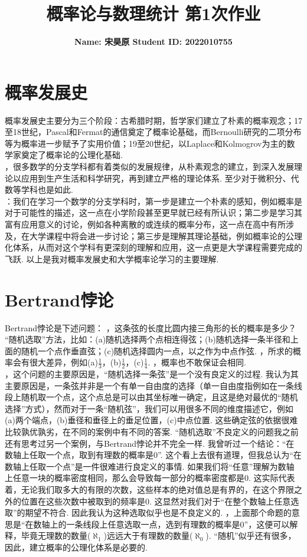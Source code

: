 \documentclass{article}
\title{\bf\Large  概率论与数理统计 第1次作业}
\author{\bf Name: 宋昊原 \qquad Student ID: 2022010755}
\begin{document}
\begin{CJK}{UTF8}{gbsn}
\maketitle

\section{概率发展史}
概率发展史主要分为三个阶段：古希腊时期，哲学家们建立了朴素的概率观念；17至18世纪，Pascal和Fermat的通信奠定了概率论基础，而Bernoulli研究的二项分布等为概率进一步赋予了实用价值；19至20世纪，以Laplace和Kolmogrov为主的数学家奠定了概率论的公理化基础.\\
，很多数学的分支学科都有着类似的发展规律，从朴素观念的建立，到深入发展理论以应用到生产生活和科学研究，再到建立严格的理论体系. 至少对于微积分、代数等学科也是如此. 
\\：我们在学习一个数学的分支学科时，第一步是建立一个朴素的感知，例如概率是对于可能性的描述，这一点在小学阶段甚至更早就已经有所认识；第二步是学习其富有应用意义的讨论，例如各种离散的或连续的概率分布，这一点在高中有所涉及，在大学课程中将会进一步讨论；第三步是理解其理论基础，例如概率论的公理化体系，从而对这个学科有更深刻的理解和应用，这一点更是大学课程需要完成的飞跃. 以上是我对概率发展史和大学概率论学习的主要理解.
\section{Bertrand悖论}
Bertrand悖论是下述问题：
，这条弦的长度比圆内接三角形的长的概率是多少？
“随机选取”方法，比如：(a)随机选择两个点相连得弦；(b)随机选择一条半径和上面的随机一个点作垂直弦；(c)随机选择圆内一点，以之作为中点作弦.
，所求的概率会有很大差异，例如(a)$\frac{1}{3}$，(b)$\frac{1}{2}$，(c)$\frac{1}{4}$.
，概率也不敢保证会相同.
\\
，这个问题的主要原因是，“随机选择一条弦”是一个没有良定义的过程. 我认为其主要原因是，一条弦并非是一个有单一自由度的选择（单一自由度指例如在一条线段上随机取一个点，这个点总是可以由其坐标唯一确定，且这是绝对最优的“随机选择”方式），然而对于一条“随机弦”，我们可以用很多不同的维度描述它，例如(a)两个端点，(b)垂径和垂径上的垂足位置，(c)中点位置. 这些确定弦的依据很难比较孰优孰劣，在不同的案例中有不同的答案.
“随机选取”不良定义的问题我之前还有思考过另一个案例，与Bertrand悖论并不完全一样. 我曾听过一个结论：“在数轴上任取一个点，取到有理数的概率是0”. 这个看上去很有道理，但我总认为“在数轴上任取一个点”是一件很难进行良定义的事情. 如果我们将“任意”理解为数轴上任意一块的概率密度相同，那么会导致每一部分的概率密度都是0. 这实际代表着，无论我们取多大的有限的次数，这些样本的绝对值总是有界的，在这个界限之外的位置在这些次数中被取到的频率是0. 这显然对我们对于“在整个数轴上任意选取”的期望不符合. 因此我认为这种选取似乎也是不良定义的.
，上面那个命题的意思是“在数轴上的一条线段上任意选取一点，选到有理数的概率是0”，这便可以解释，毕竟无理数的数量($\aleph_{1}$)远远大于有理数的数量($\aleph_{0}$).
“随机”似乎还有很多，因此，建立概率的公理化体系是必要的.


\end{CJK}
\end{document}
